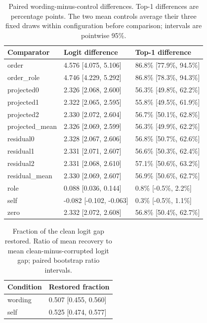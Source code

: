 \begin{table}[htbp]
\centering\footnotesize
\caption{Paired wording-minus-control differences. Top-1 differences are percentage points. The two mean controls average their three fixed draws within configuration before comparison; intervals are pointwise 95\%.}
\label{tab:b007-control-contrasts}
\begin{tabularx}{\linewidth}{@{}YYY@{}}
\toprule
Comparator & Logit difference & Top-1 difference \\
\midrule
order & 4.576 [4.075, 5.106] & 86.8\% [77.9\%, 94.5\%] \\
order\_role & 4.746 [4.229, 5.292] & 86.8\% [78.3\%, 94.3\%] \\
projected0 & 2.326 [2.068, 2.600] & 56.3\% [49.8\%, 62.2\%] \\
projected1 & 2.322 [2.065, 2.595] & 55.8\% [49.5\%, 61.9\%] \\
projected2 & 2.330 [2.072, 2.604] & 56.7\% [50.1\%, 62.8\%] \\
projected\_mean & 2.326 [2.069, 2.599] & 56.3\% [49.9\%, 62.2\%] \\
residual0 & 2.328 [2.067, 2.606] & 56.8\% [50.7\%, 62.6\%] \\
residual1 & 2.331 [2.071, 2.607] & 56.6\% [50.3\%, 62.4\%] \\
residual2 & 2.331 [2.068, 2.610] & 57.1\% [50.6\%, 63.2\%] \\
residual\_mean & 2.330 [2.069, 2.607] & 56.9\% [50.6\%, 62.7\%] \\
role & 0.088 [0.036, 0.144] & 0.8\% [-0.5\%, 2.2\%] \\
self & -0.082 [-0.102, -0.063] & 0.3\% [-0.5\%, 1.1\%] \\
zero & 2.332 [2.072, 2.608] & 56.8\% [50.4\%, 62.7\%] \\
\bottomrule
\end{tabularx}
\end{table}

\begin{table}[htbp]
\centering\footnotesize
\caption{Fraction of the clean logit gap restored. Ratio of mean recovery to mean clean-minus-corrupted logit gap; paired bootstrap ratio intervals.}
\label{tab:b007-restored-fraction}
\begin{tabularx}{\linewidth}{@{}YY@{}}
\toprule
Condition & Restored fraction \\
\midrule
wording & 0.507 [0.455, 0.560] \\
self & 0.525 [0.474, 0.577] \\
\bottomrule
\end{tabularx}
\end{table}

